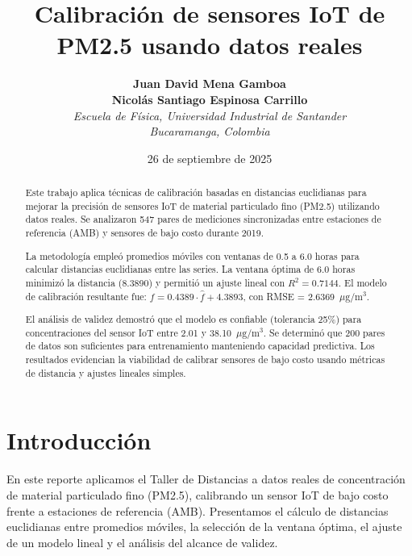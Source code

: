 \documentclass[spanish,notitlepage,letterpaper,11pt]{article} %
\begin{document}
\title{Calibración de sensores IoT de PM2.5 usando datos reales}
\author{
\textbf{Juan David Mena Gamboa} \\ 
\textbf{Nicolás Santiago Espinosa Carrillo} \\
\textit{Escuela de Física, Universidad Industrial de Santander} \\ 
\textit{Bucaramanga, Colombia}}
\date{26 de septiembre de 2025}
\maketitle
\tableofcontents
\clearpage

\begin{abstract}
Este trabajo aplica técnicas de calibración basadas en distancias euclidianas para mejorar la precisión de sensores IoT de material particulado fino (PM2.5) utilizando datos reales. Se analizaron 547 pares de mediciones sincronizadas entre estaciones de referencia (AMB) y sensores de bajo costo durante 2019.

La metodología empleó promedios móviles con ventanas de 0.5 a 6.0 horas para calcular distancias euclidianas entre las series. La ventana óptima de 6.0 horas minimizó la distancia (8.3890) y permitió un ajuste lineal con $R^2 = 0.7144$. El modelo de calibración resultante fue: \(f = 0.4389 \cdot \hat{f} + 4.3893\), con RMSE = 2.6369~$\mu\mathrm{g}/\mathrm{m}^3$.

El análisis de validez demostró que el modelo es confiable (tolerancia 25\%) para concentraciones del sensor IoT entre 2.01 y 38.10~$\mu\mathrm{g}/\mathrm{m}^3$. Se determinó que 200 pares de datos son suficientes para entrenamiento manteniendo capacidad predictiva. Los resultados evidencian la viabilidad de calibrar sensores de bajo costo usando métricas de distancia y ajustes lineales simples.
\end{abstract}

\section{Introducción}
En este reporte aplicamos el Taller de Distancias a datos reales de concentración de material particulado fino (PM2.5), calibrando un sensor IoT de bajo costo frente a estaciones de referencia (AMB). Presentamos el cálculo de distancias euclidianas entre promedios móviles, la selección de la ventana óptima, el ajuste de un modelo lineal y el análisis del alcance de validez.
\end{document}
